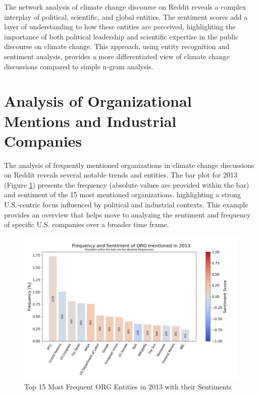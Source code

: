 The network analysis of climate change discourse on Reddit reveals a complex interplay of political, scientific, and global entities. The sentiment scores add a layer of understanding to how these entities are perceived, highlighting the importance of both political leadership and scientific expertise in the public discourse on climate change. This approach, using entity recognition and sentiment analysis, provides a more differentiated view of climate change discussions compared to simple n-gram analysis.

\section{Analysis of Organizational Mentions and Industrial Companies}
The analysis of frequently mentioned organizations in climate change discussions on Reddit reveals several notable trends and entities. The bar plot for 2013 (Figure \ref{fig:org_2013}) presents the frequency (absolute values are provided within the bar) and sentiment of the 15 most mentioned organizations, highlighting a strong U.S.-centric focus influenced by political and industrial contexts. This example provides an overview that helps move to analyzing the sentiment and frequency of specific U.S. companies over a broader time frame.

\begin{figure}[h]
    \includegraphics[width=\textwidth]{images/topic_details/entities/ORG_2013.png}
    \caption{Top 15 Most Frequent ORG Entities in 2013 with their Sentiments}
    \label{fig:org_2013}
\end{figure}

